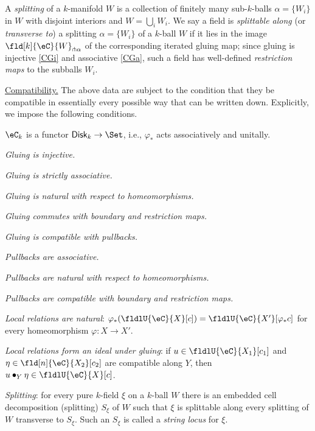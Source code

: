 \documentclass[12pt,reqno]{amsart}
\newcounter{alpha}\renewcommand\thealpha{\upshape\Alph{alpha}}
\newcommand{\Disk}{\mathsf{Disk}}
\newcommand{\C}{\eC}
\newcommand{\blt}{\bullet}
\newcommand{\defn}[1]{\emph{#1}}
\newcommand{\itemstep}[1]{\smallskip\noindent\underline{#1}}
\begin{document}
A \defn{splitting} of a $k$-manifold $W$ is a collection of finitely many sub-$k$-balls $\alpha=\{W_i\}$ in $W$ with disjoint interiors and $W=\bigcup_i W_i$. We say a field is \defn{splittable along} (or \defn{transverse to}) a splitting $\alpha=\{W_i\}$ of a $k$-ball $W$ if it lies in the image $\fld[k]{\C}{W}_{\pitchfork\alpha}$ of the corresponding iterated gluing map; since gluing is injective \ref{CGi} and associative \ref{CGa}, such a field has well-defined \defn{restriction maps} to the subballs $W_i$.

\itemstep{Compatibility.} The above data are subject to the condition that they be compatible in essentially every possible way that can be written down. Explicitly, we impose the following conditions.
\begin{lst}
    \item[(C$\varphi$)]\label{Cvarphi} $\C_k$ is a functor $\Disk_k \to \Set$, i.e., $\varphi_*$ acts associatively and unitally.
    \item[(CGi)]\label{CGi} \emph{Gluing is injective.}
    \item[(CGa)]\label{CGa} \emph{Gluing is strictly associative.}
    \item[(CG$\varphi$)]\label{CGvarphi} \emph{Gluing is natural with respect to homeomorphisms.}
    \item[(CG$\partial$)]\label{CGbk} \emph{Gluing commutes with boundary and restriction maps.}
    \item[(CG$\pi$)]\label{Cpigk} \emph{Gluing is compatible with pullbacks.}
    \item[(C$\pi$a)]\label{Cpiak} \emph{Pullbacks are associative.}
    \item[(C$\pi\varphi$)]\label{Cpivarphi} \emph{Pullbacks are natural with respect to homeomorphisms.}
    \item[(C$\pi\partial$)]\label{Cpirk} \emph{Pullbacks are compatible with boundary and restriction maps.}
    \item[(C$U\varphi$)]\label{CUvarphi} \emph{Local relations are natural}: $\varphi_*(\fldlU{\C}{X}[c])=\fldlU{\C}{X'}[\varphi_*c]$ for every homeomorphism $\varphi\colon X\to X'$.
    \item[(C$U$G)]\label{CUi} \emph{Local relations form an ideal under gluing}: if $u\in\fldlU{\C}{X_1}[c_1]$ and $\eta\in\fld[n]{\C}{X_2}[c_2]$ are compatible along $Y$, then $u\blt_Y\eta\in\fldlU{\C}{X}[c]$.
    \item[(CS)]\label{CS} \emph{Splitting}: for every pure $k$-field $\xi$ on a $k$-ball $W$ there is an embedded cell decomposition (splitting) $S_\xi$ of $W$ such that $\xi$ is splittable along every splitting of $W$ transverse to $S_\xi$. Such an $S_\xi$ is called a \defn{string locus} for $\xi$.
\end{lst}
\end{document}
